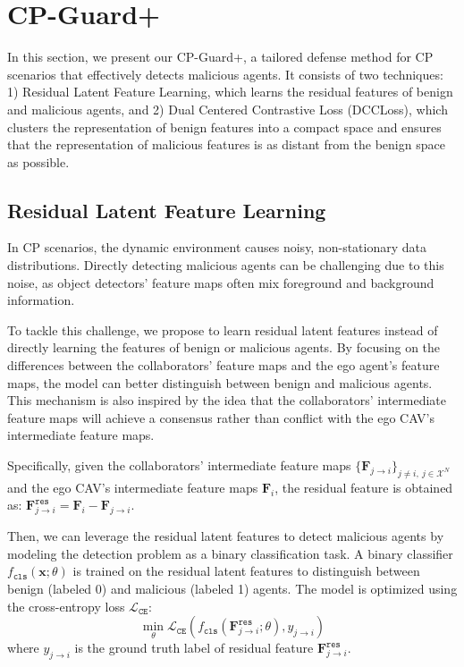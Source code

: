 \vspace{-3mm}

\section{CP-Guard+}

In this section, we present our CP-Guard+, a tailored defense method for CP scenarios that effectively detects malicious agents. It consists of two techniques: 1) Residual Latent Feature Learning, which learns the residual features of benign and malicious agents, and 2) Dual Centered Contrastive Loss (DCCLoss), which clusters the representation of benign features into a compact space and ensures that the representation of malicious features is as distant from the benign space as possible.


\subsection{Residual Latent Feature Learning}
In CP scenarios, the dynamic environment causes noisy, non-stationary data distributions. Directly detecting malicious agents can be challenging due to this noise, as object detectors' feature maps often mix foreground and background information.

To tackle this challenge, we propose to learn residual latent features instead of directly learning the features of benign or malicious agents. By focusing on the differences between the collaborators' feature maps and the ego agent's feature maps, the model can better distinguish between benign and malicious agents. This mechanism is also inspired by the idea that the collaborators' intermediate feature maps will achieve a consensus rather than conflict with the ego CAV's intermediate feature maps.

Specifically, given the collaborators' intermediate feature maps $\{\mathbf{F}_{j\rightarrow i}\}_{j\neq i,\  j\in \mathcal{X}^N}$ and the ego CAV's intermediate feature maps $\mathbf{F}_i$, the residual feature is obtained as: $\mathbf{F}^\mathtt{res}_{j\rightarrow i}= \mathbf{F}_i - \mathbf{F}_{j\rightarrow i}.$ 

Then, we can leverage the residual latent features to detect malicious agents by modeling the detection problem as a binary classification task. A binary classifier $f_{\mathtt{cls}}(\mathbf{x}; \theta)$ is trained on the residual latent features to distinguish between benign (labeled 0) and malicious (labeled 1) agents. The model is optimized using the cross-entropy loss $\mathcal{L}_\mathtt{CE}$:
\begin{equation}
    \min_\theta \mathcal{L}_\mathtt{CE} (f_{\mathtt{cls}}(\mathbf{F}^\mathtt{res}_{j\rightarrow i}; \theta), y_{j\rightarrow i})
\end{equation}
where $y_{j\rightarrow i}$ is the ground truth label of residual feature $\mathbf{F}^\mathtt{res}_{j\rightarrow i}$.


